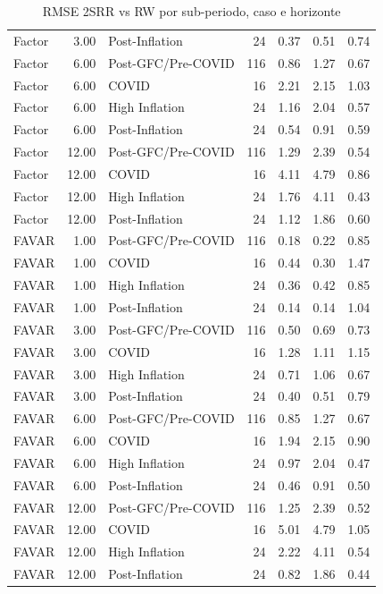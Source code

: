 \begin{table}[ht]
\begin{tabular}{lrlrrrr}
  Factor & 3.00 & Post-Inflation &  24 & 0.37 & 0.51 & 0.74 \\ 
  Factor & 6.00 & Post-GFC/Pre-COVID & 116 & 0.86 & 1.27 & 0.67 \\ 
  Factor & 6.00 & COVID &  16 & 2.21 & 2.15 & 1.03 \\ 
  Factor & 6.00 & High Inflation &  24 & 1.16 & 2.04 & 0.57 \\ 
  Factor & 6.00 & Post-Inflation &  24 & 0.54 & 0.91 & 0.59 \\ 
  Factor & 12.00 & Post-GFC/Pre-COVID & 116 & 1.29 & 2.39 & 0.54 \\ 
  Factor & 12.00 & COVID &  16 & 4.11 & 4.79 & 0.86 \\ 
  Factor & 12.00 & High Inflation &  24 & 1.76 & 4.11 & 0.43 \\ 
  Factor & 12.00 & Post-Inflation &  24 & 1.12 & 1.86 & 0.60 \\ 
  FAVAR & 1.00 & Post-GFC/Pre-COVID & 116 & 0.18 & 0.22 & 0.85 \\ 
  FAVAR & 1.00 & COVID &  16 & 0.44 & 0.30 & 1.47 \\ 
  FAVAR & 1.00 & High Inflation &  24 & 0.36 & 0.42 & 0.85 \\ 
  FAVAR & 1.00 & Post-Inflation &  24 & 0.14 & 0.14 & 1.04 \\ 
  FAVAR & 3.00 & Post-GFC/Pre-COVID & 116 & 0.50 & 0.69 & 0.73 \\ 
  FAVAR & 3.00 & COVID &  16 & 1.28 & 1.11 & 1.15 \\ 
  FAVAR & 3.00 & High Inflation &  24 & 0.71 & 1.06 & 0.67 \\ 
  FAVAR & 3.00 & Post-Inflation &  24 & 0.40 & 0.51 & 0.79 \\ 
  FAVAR & 6.00 & Post-GFC/Pre-COVID & 116 & 0.85 & 1.27 & 0.67 \\ 
  FAVAR & 6.00 & COVID &  16 & 1.94 & 2.15 & 0.90 \\ 
  FAVAR & 6.00 & High Inflation &  24 & 0.97 & 2.04 & 0.47 \\ 
  FAVAR & 6.00 & Post-Inflation &  24 & 0.46 & 0.91 & 0.50 \\ 
  FAVAR & 12.00 & Post-GFC/Pre-COVID & 116 & 1.25 & 2.39 & 0.52 \\ 
  FAVAR & 12.00 & COVID &  16 & 5.01 & 4.79 & 1.05 \\ 
  FAVAR & 12.00 & High Inflation &  24 & 2.22 & 4.11 & 0.54 \\ 
  FAVAR & 12.00 & Post-Inflation &  24 & 0.82 & 1.86 & 0.44 \\ 
   \hline
\end{tabular}
\caption{RMSE 2SRR vs RW por sub-periodo, caso e horizonte} 
\label{tab:subperiodos}
\end{table}
